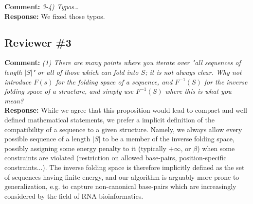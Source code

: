 \documentclass[11pt,hyperref,draft]{article} %
\newcommand{\Answer}[1]{\noindent\textsf{\textbf{Response: }}{\sf#1}\\}
\newcommand{\Comment}[1]{\noindent\textsf{\textbf{Comment: }}{\it#1}\\[.5em]}
\begin{document}
\Comment{3-4) Typos\ldots}
\Answer{We fixed those typos.}

\subsection{Reviewer \#3}

\Comment{(1) There are many points where you iterate over "all sequences of length $|S|$" or all of those which can fold into $S$; it is not always clear. Why not introduce $F(s)$ for the folding space of a sequence, and $F^{-1}(S)$ for the inverse folding space of a structure, and simply use $F^{-1}(S)$ where this is what you mean?}
\Answer{While we agree that this proposition would lead to compact and well-defined mathematical statements, we prefer a implicit definition of the compatibility of a sequence to a given structure. Namely, we always allow every possible sequence of a length $|S|$ to be a member of the inverse folding space, possibly assigning some  energy penalty to it  (typically $+\infty$, or $\beta$) when some constraints are violated (restriction on allowed base-pairs, position-specific constraints...). The inverse folding space is therefore implicitly defined as the set of sequences having finite energy, and our algorithm is arguably more prone to generalization, e.g. to capture non-canonical base-pairs which are increasingly considered by the field of RNA bioinformatics.
}
\end{document}
